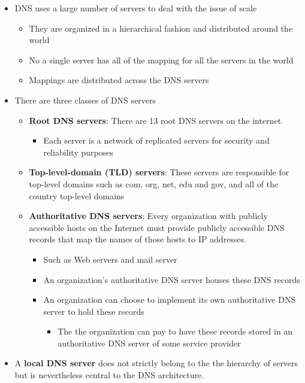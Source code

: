 \documentclass[11pt]{article}
\providecommand{\tightlist}{%
      \setlength{\itemsep}{0pt}\setlength{\parskip}{0pt}}
\begin{document}
\begin{itemize}
\tightlist
\item
  DNS uses a large number of servers to deal with the issue of scale

  \begin{itemize}
  \tightlist
  \item
    They are organized in a hierarchical fashion and distributed around
    the world
  \item
    No a single server has all of the mapping for all the servers in the
    world
  \item
    Mappings are distributed across the DNS servers
  \end{itemize}
\item
  There are three classes of DNS servers

  \begin{itemize}
  \tightlist
  \item
    \textbf{Root DNS servers}: There are 13 root DNS servers on the
    internet

    \begin{itemize}
    \tightlist
    \item
      Each server is a network of replicated servers for security and
      reliability purposes
    \end{itemize}
  \item
    \textbf{Top-level-domain (TLD) servers}: These servers are
    responsible for top-level domains such as com, org, net, edu and
    gov, and all of the country top-level domains
  \item
    \textbf{Authoritative DNS servers}: Every organization with publicly
    accessible hosts on the Internet must provide publicly accessible
    DNS records that map the names of those hosts to IP addresses.

    \begin{itemize}
    \tightlist
    \item
      Such as Web servers and mail server
    \item
      An organization's authoritative DNS server houses these DNS
      records
    \item
      An organization can choose to implement its own authoritative DNS
      server to hold these records

      \begin{itemize}
      \tightlist
      \item
        The the organization can pay to have these records stored in an
        authoritative DNS server of some service provider
      \end{itemize}
    \end{itemize}
  \end{itemize}
\item
  A \textbf{local DNS server} does not strictly belong to the the
  hierarchy of servers but is nevertheless central to the DNS
  architecture.


\end{itemize}
\end{document}
